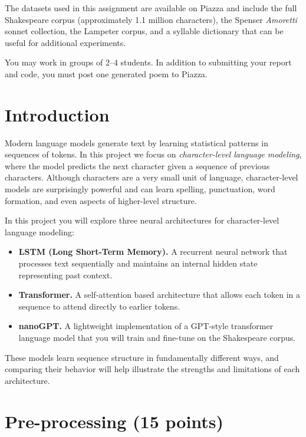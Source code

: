 The datasets used in this assignment are available on Piazza and include the
full Shakespeare corpus (approximately 1.1 million characters), the Spenser
\emph{Amoretti} sonnet collection, the Lampeter corpus, and a syllable dictionary
that can be useful for additional experiments.

You may work in groups of 2--4 students. In addition to submitting your report
and code, you must post one generated poem to Piazza.

\section{Introduction}

Modern language models generate text by learning statistical patterns in
sequences of tokens. In this project we focus on \emph{character-level language
modeling}, where the model predicts the next character given a sequence of
previous characters. Although characters are a very small unit of language,
character-level models are surprisingly powerful and can learn spelling,
punctuation, word formation, and even aspects of higher-level structure.

In this project you will explore three neural architectures for character-level
language modeling:

\begin{itemize}

\item \textbf{LSTM (Long Short-Term Memory).} A recurrent neural network that
processes text sequentially and maintains an internal hidden state representing
past context.

\item \textbf{Transformer.} A self-attention based architecture that allows each
token in a sequence to attend directly to earlier tokens.

\item \textbf{nanoGPT.} A lightweight implementation of a GPT-style transformer
language model that you will train and fine-tune on the Shakespeare corpus.

\end{itemize}

These models learn sequence structure in fundamentally different ways, and
comparing their behavior will help illustrate the strengths and limitations of
each architecture.
\pagebreak
\section{Pre-processing (15 points)}

